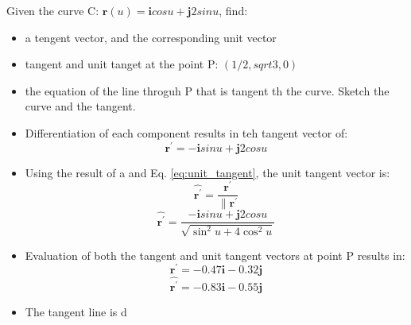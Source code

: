 Given the curve C: $\boldsymbol{r}\left(u\right)=\boldsymbol{i}cos u+\boldsymbol{j}2sin u$, find:
\begin{itemize}
	\item a tengent vector, and the corresponding unit vector
	\item tangent and unit tanget at the point P: $\left( 1/2 , sqrt{3},0\right)$
	\item the equation of the line throguh P that is tangent th the curve. Sketch the curve and the tangent.
\end{itemize}

\begin{itemize}
	\item Differentiation of each component results in teh tangent vector of:
	\begin{equation*}
		\boxed{
			\boldsymbol{r}^\prime= -\boldsymbol{i}sin u + \boldsymbol{j}2 cos u
		}
	\end{equation*}

	\item Using the result of a and Eq. \ref{eq:unit_tangent}, the unit tangent vector is:
		\begin{equation}
			\hat{\boldsymbol{r}^\prime}=\frac{\boldsymbol{r}^\prime}{\|\boldsymbol{r}^\prime}
			\label{eq:unit_tangent}
		\end{equation}
	\begin{equation*}
		\boxed{
			\hat{\boldsymbol{r}^\prime}= \frac{-\boldsymbol{i}sin u + \boldsymbol{j}2 cos u}{\sqrt{\sin^2u+4\cos^2u}}
		}
	\end{equation*}
\item Evaluation of both the tangent and unit tangent vectors at point P results in:
	\begin{equation*}
		\boxed{
			\boldsymbol{r}^\prime=-0.47\boldsymbol{i}-0.32\boldsymbol{j}
			}
		\end{equation*}
	\begin{equation*}
		\boxed{
			\hat{\boldsymbol{r}^\prime}=-0.83\boldsymbol{i}-0.55\boldsymbol{j}
			}
	\end{equation*}
\item The tangent line is d
	
\end{itemize}
